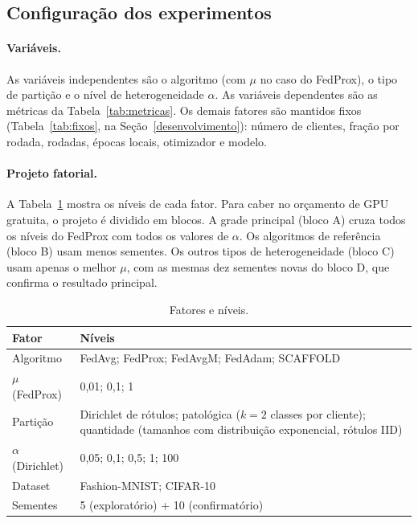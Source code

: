 \subsection{Configuração dos experimentos}

\paragraph{Variáveis.} As variáveis independentes são o algoritmo (com $\mu$ no caso do FedProx), o tipo de partição e o nível de heterogeneidade $\alpha$. As variáveis dependentes são as métricas da Tabela~\ref{tab:metricas}. Os demais fatores são mantidos fixos (Tabela~\ref{tab:fixos}, na Seção~\ref{desenvolvimento}): número de clientes, fração por rodada, rodadas, épocas locais, otimizador e modelo.

\paragraph{Projeto fatorial.} A Tabela~\ref{tab:fatores} mostra os níveis de cada fator. Para caber no orçamento de GPU gratuita, o projeto é dividido em blocos. A grade principal (bloco A) cruza todos os níveis do FedProx com todos os valores de $\alpha$. Os algoritmos de referência (bloco B) usam menos sementes. Os outros tipos de heterogeneidade (bloco C) usam apenas o melhor $\mu$, com as mesmas dez sementes novas do bloco D, que confirma o resultado principal.

\begin{table}[ht]
    \centering\small
    \caption{Fatores e níveis.}
    \label{tab:fatores}
    \begin{tabular}{@{}p{2.3cm}p{5.5cm}@{}}
        \toprule
        Fator & Níveis \\
        \midrule
        Algoritmo & FedAvg; FedProx; FedAvgM; FedAdam; SCAFFOLD \\
        $\mu$ (FedProx) & 0,01; 0,1; 1 \\
        Partição & Dirichlet de rótulos; patológica ($k = 2$ classes por cliente); quantidade (tamanhos com distribuição exponencial, rótulos IID) \\
        $\alpha$ (Dirichlet) & 0,05; 0,1; 0,5; 1; 100 \\
        Dataset & Fashion-MNIST; CIFAR-10 \\
        Sementes & 5 (exploratório) + 10 (confirmatório) \\
        \bottomrule
    \end{tabular}
\end{table}

